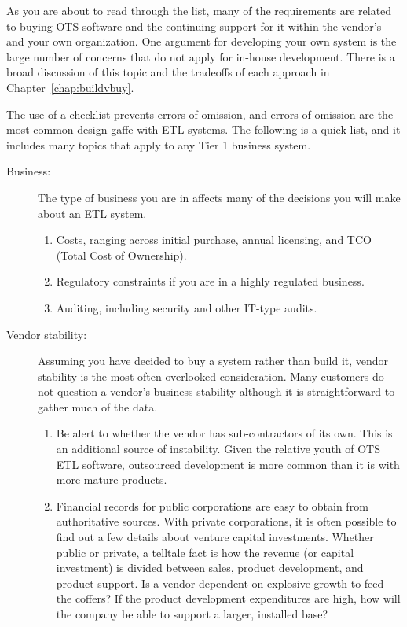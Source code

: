 \documentclass[11pt,letterpaper,twosided]{memoir}
\begin{document}
As you are about to read through the list, many of the requirements
are related to buying OTS software and the continuing support
for it within the vendor's and your own organization. One argument
for developing your own system is the large number of concerns
that do not apply for in-house development. There is a broad
discussion of this topic and the tradeoffs of each approach 
in Chapter~\ref{chap:buildvbuy}.

The use of a checklist prevents errors of omission, and errors
of omission are the most common design gaffe with ETL systems. The
following is a quick list, and it includes many topics that apply
to any Tier 1 business system.

\begin{description}
\item[Business:] The type of business you are in affects many of
the decisions you will make about an ETL system.

\begin{enumerate}
\item Costs, ranging across initial purchase, annual licensing, and
TCO (Total Cost of Ownership).

\item Regulatory constraints if you are in a highly regulated business.

\item Auditing, including security and other IT-type audits.

\end{enumerate}

\item[Vendor stability:] Assuming you have decided to buy a system
rather than build it, vendor stability is the most often overlooked 
consideration. Many customers do not question a vendor's business stability
although it is straightforward to gather much of the data.

\begin{enumerate}
\item Be alert to whether the vendor has sub-contractors of its own.
This is an additional source of instability. Given the relative
youth of OTS ETL software, outsourced development is more common
than it is with more mature products.

\item Financial records for public corporations are easy to obtain
from authoritative sources. With private corporations, it is often
possible to find out a few details about venture capital investments.
Whether public or private, a telltale fact is how the revenue (or
capital investment) is divided between sales, product development, 
and product support. Is a vendor dependent on explosive growth
to feed the coffers? If the product development expenditures are
high, how will the company be able to support a larger, installed
base?


\end{enumerate}
\end{description}
\end{document}
